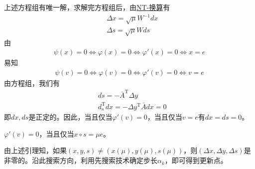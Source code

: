             上述方程组有唯一解，求解完方程组后，由\underline{NT-换算}有
            \begin{align*}
            & \Delta x=\sqrt{\mu}W^{-1}dx\\
            & \Delta s=\sqrt{\mu}Wds
            \end{align*}
            由
            \begin{align*}
             {\psi}(x)=0\Leftrightarrow {\varphi}(x)=0\Leftrightarrow {\varphi}'(x)=0\Leftrightarrow x=e
            \end{align*}
            易知
            \begin{align*}
             {\psi}(v)=0\Leftrightarrow {\varphi}(v)=0\Leftrightarrow {\varphi}'(v)=0\Leftrightarrow v=e
            \end{align*}
            由方程组，我们有
            \begin{align*}
             & ds=-{\bar{A}}^\mathrm{T} \Delta y\\
             & d_s^\mathrm{T} dx=-\Delta y^\mathrm{T} \bar{A}dx=0
            \end{align*}
            即$dx,ds$是正定的。因此，当且仅当${\varphi}'(v)=0$，当且仅当$v=e$有$dx=ds=0$。
            \begin{lemma}
            ${\varphi}'(v)=0$，当且仅当$x\circ s=\mu e$。
            \end{lemma}
            \par
            由上述引理知，如果$(x,y,s)\neq (x(\mu),y(\mu),s(\mu))$，则$(\Delta x,\Delta y,\Delta s)$是非零的。沿此搜索方向，利用先搜索技术确定步长${\alpha}_k$，即可得到更新点。
